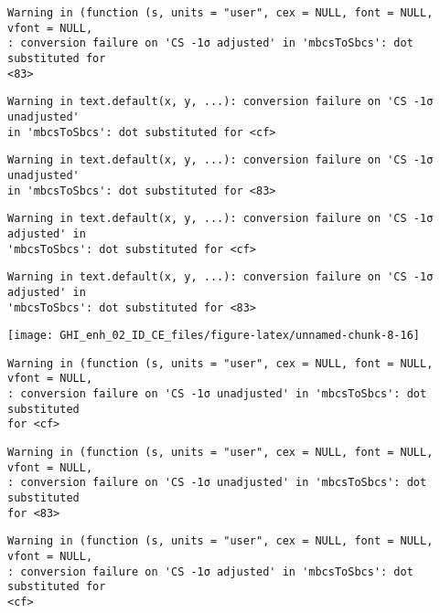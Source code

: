 \documentclass[
  10pt,
  a4paper,oneside]{article}
\begin{document}
\begin{verbatim}
Warning in (function (s, units = "user", cex = NULL, font = NULL, vfont = NULL,
: conversion failure on 'CS -1σ adjusted' in 'mbcsToSbcs': dot substituted for
<83>
\end{verbatim}

\begin{verbatim}
Warning in text.default(x, y, ...): conversion failure on 'CS -1σ unadjusted'
in 'mbcsToSbcs': dot substituted for <cf>
\end{verbatim}

\begin{verbatim}
Warning in text.default(x, y, ...): conversion failure on 'CS -1σ unadjusted'
in 'mbcsToSbcs': dot substituted for <83>
\end{verbatim}

\begin{verbatim}
Warning in text.default(x, y, ...): conversion failure on 'CS -1σ adjusted' in
'mbcsToSbcs': dot substituted for <cf>
\end{verbatim}

\begin{verbatim}
Warning in text.default(x, y, ...): conversion failure on 'CS -1σ adjusted' in
'mbcsToSbcs': dot substituted for <83>
\end{verbatim}

\begin{center}\texttt{[image: GHI\_enh\_02\_ID\_CE\_files/figure-latex/unnamed-chunk-8-16]} \end{center}

\begin{verbatim}
Warning in (function (s, units = "user", cex = NULL, font = NULL, vfont = NULL,
: conversion failure on 'CS -1σ unadjusted' in 'mbcsToSbcs': dot substituted
for <cf>
\end{verbatim}

\begin{verbatim}
Warning in (function (s, units = "user", cex = NULL, font = NULL, vfont = NULL,
: conversion failure on 'CS -1σ unadjusted' in 'mbcsToSbcs': dot substituted
for <83>
\end{verbatim}

\begin{verbatim}
Warning in (function (s, units = "user", cex = NULL, font = NULL, vfont = NULL,
: conversion failure on 'CS -1σ adjusted' in 'mbcsToSbcs': dot substituted for
<cf>
\end{verbatim}
\end{document}
